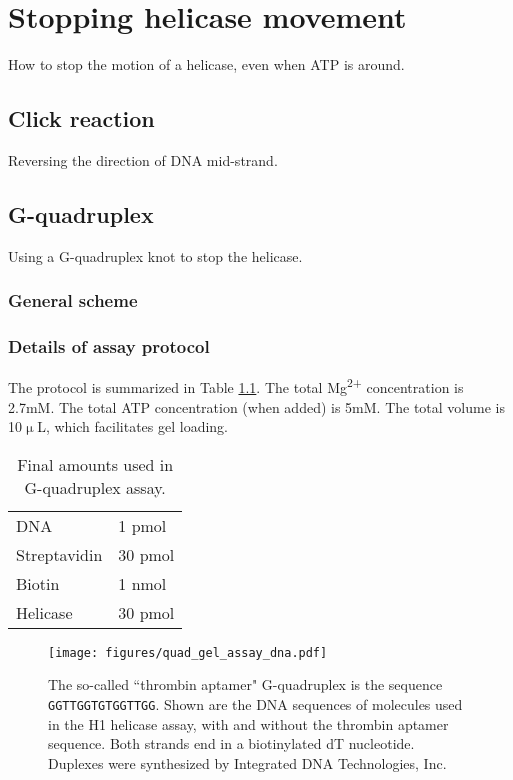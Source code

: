 \chapter{Stopping helicase movement}
\label{click_reaction_quad}

How to stop the motion of a helicase, even when ATP is around.

\section{Click reaction}

Reversing the direction of DNA mid-strand.

\section{G-quadruplex}

Using a G-quadruplex knot to stop the helicase.

\subsection{General scheme}

\subsection{Details of assay protocol}

The protocol is summarized in Table \ref{table:quad_gel_assay_summary}.  The total Mg\textsuperscript{2+} concentration is 2.7mM.  The total ATP concentration (when added) is 5mM.  The total volume is 10$\upmu$L, which facilitates gel loading.

\begin{table}[h]
\begin{center}
\captionsetup{justification=centering}
\caption[Stopping helicase: G-quadruplex assay summary]{Final amounts used in G-quadruplex assay.} 
\label{table:quad_gel_assay_summary}
\begin{tabularx}{0.5\textwidth}{|X|X|}
\hline
DNA & 1 pmol \\
Streptavidin & 30 pmol \\
Biotin & 1 nmol \\
Helicase & 30 pmol \\
\hline
\end{tabularx}
\end{center}
\end{table}

\begin{figure}[h]
\begin{centering}
\texttt{[image: figures/quad\_gel\_assay\_dna.pdf]}
\caption[Stopping helicase: G-quadruplex and control sequences]{The so-called ``thrombin aptamer" G-quadruplex is the sequence \texttt{GGTTGGTGTGGTTGG}.  Shown are the DNA sequences of molecules used in the H1 helicase assay, with and without the thrombin aptamer sequence.  Both strands end in a biotinylated dT nucleotide.  Duplexes were synthesized by Integrated DNA Technologies, Inc.}
\label{fig:quad_gel_assay_dna}
\end{centering}
\end{figure}

